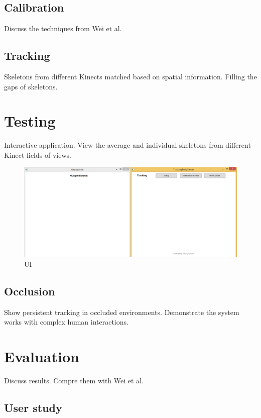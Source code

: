 \documentclass{sigchi}
\begin{document}
\subsection{Calibration}

Discuss the techniques from Wei et al.

\subsection{Tracking}

Skeletons from different Kinects matched based on spatial information. Filling the gaps of skeletons.

\section{Testing}

Interactive application. View the average and individual skeletons from different Kinect fields of views.

\begin{figure}
  \centering
  \includegraphics[width=0.9\columnwidth]{ui}
  \caption{UI}
  \label{fig:ui}
\end{figure}

\subsection{Occlusion}

Show persistent tracking in occluded environments. Demonstrate the system works with complex human interactions.
 
\section{Evaluation}

Discuss results. Compre them with Wei et al.

\subsection{User study}
\end{document}
